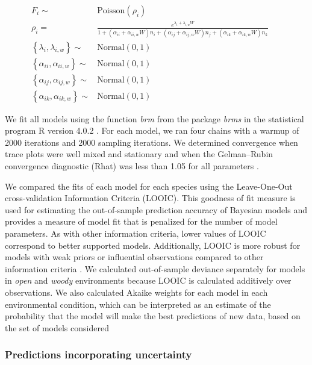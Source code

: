 \begin{refsection}
\begin{align}
 F_{i} \sim& {\textrm{Poisson}}(\rho_{i}) && \\
\rho_{i} =& \frac{e^{\lambda_{i} + \lambda_{i,w}W}} {1 + (\alpha_{ii} + \alpha_{ii,w}W)n_{i} + (\alpha_{ij} + \alpha_{ij,w}W) n_{j} + (\alpha_{ik} + \alpha_{ik,w}W)n_{k}} &&   \\
{ \left \{ \lambda_{i}, \lambda_{i,w} \right \}} \sim& {\textrm{Normal}}(0,1) &&\\
 { \left \{ \alpha_{ii}, \alpha_{ii,w} \right \}} \sim& {\textrm{Normal}}(0,1) &&\\
 {\left \{ \alpha_{ij}, \alpha_{ij,w} \right \}} \sim& {\textrm{Normal}}(0,1) &&\\
 {\left \{ \alpha_{ik}, \alpha_{ik,w} \right \}} \sim& {\textrm{Normal}}(0,1) &&
\end{align}

We fit all models using the function \textit{brm} from the package \textit{brms} \citep{burkner_advanced_2017} in the statistical program R version 4.0.2 \citep{Rcore}. For each model, we ran four chains with a warmup of 2000 iterations and 2000 sampling iterations. We determined convergence when trace plots were well mixed and stationary and when the Gelman--Rubin convergence diagnostic (Rhat) was less than 1.05 for all parameters \citep{vehtari_rank-normalization_2020}.

We compared the fits of each model for each species using the Leave-One-Out cross-validation Information Criteria (LOOIC). This goodness of fit measure is used for estimating the out-of-sample prediction accuracy of Bayesian models and provides a measure of model fit that is penalized for the number of model parameters. As with other information criteria, lower values of LOOIC correspond to better supported models. Additionally, LOOIC is more robust for models with weak priors or influential observations compared to other information criteria \citep{vehtari2017practical}. We calculated out-of-sample deviance separately for models in \textit{open} and \textit{woody} environments because LOOIC is calculated additively over observations. We also calculated Akaike weights for each model in each environmental condition, which can be interpreted as an estimate of the probability that the model will make the best predictions of new data, based on the set of models considered \citep{mcelreath_statistical_2018}

\subsubsection*{Predictions incorporating uncertainty}


\end{refsection}
